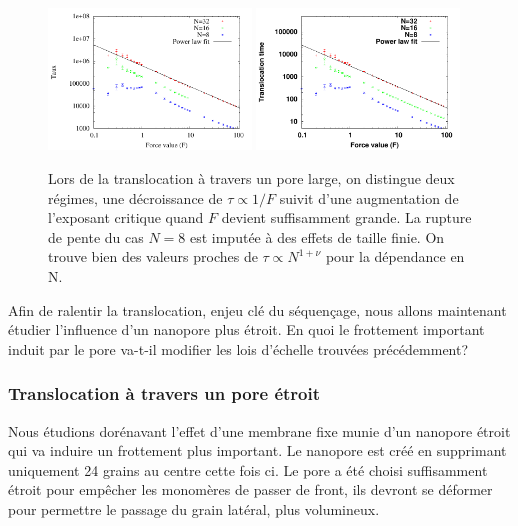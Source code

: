 \documentclass[a4paper,11pt]{article}
\begin{document}
\begin{figure}[H]
\begin{center}
\includegraphics[width=0.48\textwidth]{translocfholebigger.pdf} \includegraphics[width=0.48\textwidth]{translocholebigger.pdf}

\caption{Lors de la translocation à travers un pore large, on distingue deux régimes, une décroissance de $\tau \propto 1/F$ suivit d'une augmentation de l'exposant critique quand $F$ devient suffisamment grande. La rupture de pente du cas $N=8$ est imputée à des effets de taille finie. On trouve bien des valeurs proches de $\tau \propto N^{1+\nu}$ pour la dépendance en N.}
\label{holebigger}
\end{center}
\end{figure}

Afin de ralentir la translocation, enjeu clé du séquençage, nous allons maintenant étudier l'influence d'un nanopore plus étroit. En quoi le frottement important induit par le pore va-t-il modifier les lois d'échelle trouvées précédemment?


\subsubsection*{Translocation à travers un pore étroit}
Nous étudions dorénavant l'effet d'une membrane fixe munie d'un nanopore étroit qui va induire un frottement plus important. Le nanopore est créé en supprimant uniquement 24 grains au centre cette fois ci. Le pore a été choisi suffisamment étroit pour empêcher les monomères de passer de front, ils devront se déformer pour permettre le passage du grain latéral, plus volumineux.\\
\end{document}
